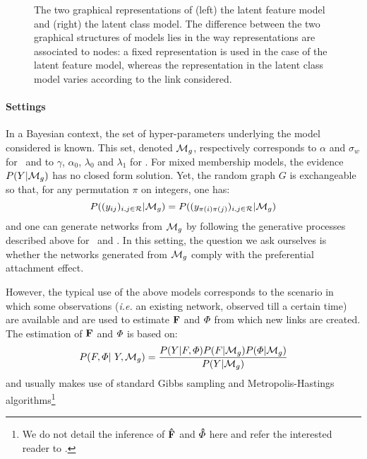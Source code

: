 \begin{figure}[t]
	\centering
	\vspace{1cm}
	\scalebox{0.88}{
	}
	\endminipage
	\scalebox{0.88}{
		}
	\endminipage
	\caption{The two graphical representations of (left) the latent feature model and (right) the latent class model. The difference between the two graphical structures of  models lies in the way representations are associated to nodes: a fixed representation is used in the case of the latent feature model, whereas the representation in the latent class model varies according to the link considered.}
	\label{fig:mmm}
\end{figure}

\paragraph{Settings} In a Bayesian context, the set of hyper-parameters underlying the model considered is known. This set, denoted $\mathcal{M}_g$, respectively corresponds to $\alpha$ and $\sigma_w$ for \ifm\ and to $\gamma$,  $\alpha_0$, $\lambda_0$ and $\lambda_1$ for \imb. For mixed membership models, the evidence $P(Y|\mathcal{M}_g)$ has no closed form solution. Yet, the random graph $G$ is exchangeable so that, for any permutation $\pi$ on integers, one has:
%
\[
P((y_{ij})_{i,j\in \mathcal{R}} | \mathcal{M}_g) = P((y_{\pi(i)\pi(j)})_{i,j\in \mathcal{R}} | \mathcal{M}_g)
\]
%
and one can generate networks from $\mathcal{M}_g$ by following the generative processes described above for \ifm\ and \imb. In this setting, the question we ask ourselves is whether the networks generated from $\mathcal{M}_g$ comply with the preferential attachment effect.

However, the typical use of the above models corresponds to the scenario in which some observations (\textit{i.e.} an existing network, observed till a certain time) are available and are used to estimate $\mathbf{F}$ and $\mat{\Phi}$ from which new links are created. The estimation of $\mathbf{F}$ and $\mat{\Phi}$ is based on:
%
\begin{equation}
    \p(F, \Phi | Y, \mg) = \frac{\p(Y|F,\Phi)\p(F|\mg)\p(\Phi|\mg)}{\p(Y|\mg)}
\end{equation}
%
and usually makes use of standard Gibbs sampling and Metropolis-Hastings algorithms\footnote{We do not detail the inference of  $\mathbf{\hat{F}}$ and $\mat{\hat{\Phi}}$ here and refer the interested reader to \cite{ILFRM,IBP,HDP,fan2015dynamic}.}

